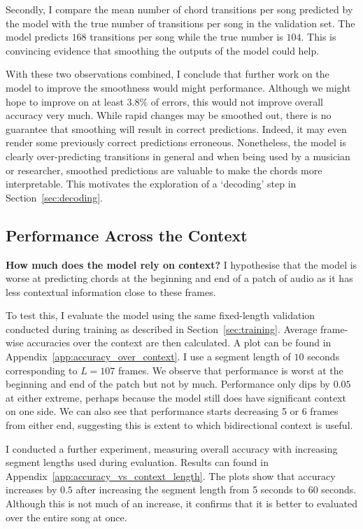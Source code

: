 Secondly, I compare the mean number of chord transitions per song predicted by the model with the true number of transitions per song in the validation set. The model predicts $168$ transitions per song while the true number is $104$. This is convincing evidence that smoothing the outputs of the model could help. 

With these two observations combined, I conclude that further work on the model to improve the smoothness would might performance. Although we might hope to improve on at least $3.8\%$ of errors, this would not improve overall accuracy very much. While rapid changes may be smoothed out, there is no guarantee that smoothing will result in correct predictions. Indeed, it may even render some previously correct predictions erroneous. Nonetheless, the model is clearly over-predicting transitions in general and when being used by a musician or researcher, smoothed predictions are valuable to make the chords more interpretable. This motivates the exploration of a `decoding' step in Section~\ref{sec:decoding}. 

\subsection{Performance Across the Context}\label{sec:crnn_performance_across_context}

\textbf{How much does the model rely on context?} I hypothesise that the model is worse at predicting chords at the beginning and end of a patch of audio as it has less contextual information close to these frames. 


To test this, I evaluate the model using the same fixed-length validation conducted during training as described in Section~\ref{sec:training}. Average frame-wise accuracies over the context are then calculated. A plot can be found in Appendix~\ref{app:accuracy_over_context}. I use a segment length of $10$ seconds corresponding to $L=107$ frames. We observe that performance is worst at the beginning and end of the patch but not by much. Performance only dips by $0.05$ at either extreme, perhaps because the model still does have significant context on one side. We can also see that performance starts decreasing 5 or 6 frames from either end, suggesting this is extent to which bidirectional context is useful.

I conducted a further experiment, measuring overall accuracy with increasing segment lengths used during evaluation. Results can found in Appendix~\ref{app:accuracy_vs_context_length}. The plots show that accuracy increases by $0.5$ after increasing the segment length from 5 seconds to 60 seconds. Although this is not much of an increase, it confirms that it is better to evaluated over the entire song at once.

